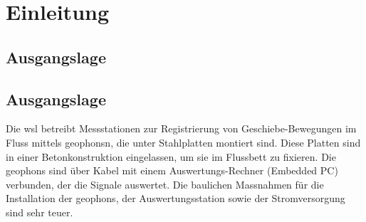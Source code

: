 %
%



\chapter{Einleitung}\label{chap.einleitung}

\section{Ausgangslage}
\section{Ausgangslage}\label{sec.ausgangslage}
Die \gls{wsl} betreibt Messstationen zur Registrierung von Geschiebe-Bewegungen im Fluss mittels \glspl{geophon}n, die unter Stahlplatten montiert sind. Diese Platten sind in einer Betonkonstruktion eingelassen, um sie im Flussbett zu fixieren. Die \glspl{geophon} sind über Kabel mit einem Auswertungs-Rechner (Embedded PC) verbunden, der die Signale auswertet. Die baulichen Massnahmen für die Installation der \glspl{geophon}, der Auswertungsstation sowie der Stromversorgung sind sehr teuer. 


